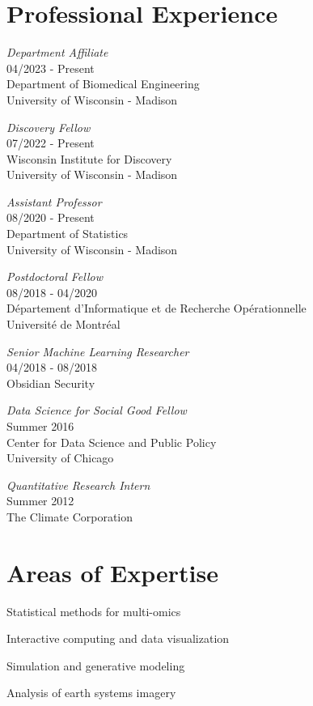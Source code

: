 \documentclass[letterpaper]{article}
\renewenvironment{itemize}{
  \begin{list}{}{
    \setlength{\leftmargin}{1.5em}
  }
}{
  \end{list}
}
\begin{document}
\section*{Professional Experience}
\begin{itemize}
\item \textit{Department Affiliate}\\
04/2023 - Present \\
Department of Biomedical Engineering \\
University of Wisconsin - Madison

\item \textit{Discovery Fellow} \\
07/2022 - Present \\
Wisconsin Institute for Discovery \\
University of Wisconsin - Madison

\item \textit{Assistant Professor}\\
08/2020 - Present \\
Department of Statistics \\
University of Wisconsin - Madison

\item \textit{Postdoctoral Fellow}\\
08/2018 - 04/2020 \\
D\'epartement d'Informatique et de Recherche Op\'erationnelle \\
Universit\'e de Montr\'eal

\item \textit{Senior Machine Learning Researcher} \\
  04/2018 - 08/2018 \\
  Obsidian Security
\item \textit{Data Science for Social Good Fellow} \\
  Summer 2016 \\
  Center for Data Science and Public Policy\\
  University of Chicago
\item \textit{Quantitative Research Intern} \\
  Summer 2012 \\
  The Climate Corporation
\end{itemize}

\section*{Areas of Expertise}
\begin{itemize}
  \item Statistical methods for multi-omics
  \item Interactive computing and data visualization
  \item Simulation and generative modeling
  \item Analysis of earth systems imagery
\end{itemize}
\end{document}
